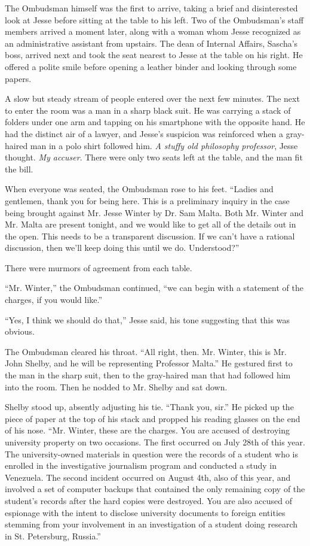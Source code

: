 \documentclass[12pt]{book}
\begin{document}
The Ombudsman himself was the first to arrive, taking a brief and disinterested look at Jesse before sitting at the table to his left.  Two of the Ombudsman's staff members arrived a moment later, along with a woman whom Jesse recognized as an administrative assistant from upstairs.  The dean of Internal Affairs, Sascha's boss, arrived next and took the seat nearest to Jesse at the table on his right.  He offered a polite smile before opening a leather binder and looking through some papers.

A slow but steady stream of people entered over the next few minutes.  The next to enter the room was a man in a sharp black suit.  He was carrying a stack of folders under one arm and tapping on his smartphone with the opposite hand.  He had the distinct air of a lawyer, and Jesse's suspicion was reinforced when a gray-haired man in a polo shirt followed him.  \emph{A stuffy old philosophy professor}, Jesse thought.  \emph{My accuser}.  There were only two seats left at the table, and the man fit the bill.  

When everyone was seated, the Ombudsman rose to his feet.  ``Ladies and gentlemen, thank you for being here.  This is a preliminary inquiry in the case being brought against Mr. Jesse Winter by Dr. Sam Malta.  Both Mr. Winter and Mr. Malta are present tonight, and we would like to get all of the details out in the open.  This needs to be a transparent discussion.  If we can't have a rational discussion, then we'll keep doing this until we do.  Understood?''

There were murmors of agreement from each table.

``Mr. Winter,'' the Ombudsman continued, ``we can begin with a statement of the charges, if you would like.''

``Yes, I think we should do that,'' Jesse said, his tone suggesting that this was obvious.

The Ombudsman cleared his throat.  ``All right, then.  Mr. Winter, this is Mr. John Shelby, and he will be representing Professor Malta.''  He gestured first to the man in the sharp suit, then to the gray-haired man that had followed him into the room.  Then he nodded to Mr. Shelby and sat down.

Shelby stood up, absently adjusting his tie.  ``Thank you, sir.''  He picked up the piece of paper at the top of his stack and propped his reading glasses on the end of his nose.  ``Mr. Winter, these are the charges.  You are accused of destroying university property on two occasions.  The first occurred on July 28th of this year.  The university-owned materials in question were the records of a student who is enrolled in the investigative journalism program and conducted a study in Venezuela.  The second incident occurred on August 4th, also of this year, and involved a set of computer backups that contained the only remaining copy of the student's records after the hard copies were destroyed.  You are also accused of espionage with the intent to disclose university documents to foreign entities stemming from your involvement in an investigation of a student doing research in St. Petersburg, Russia.''
\end{document}
